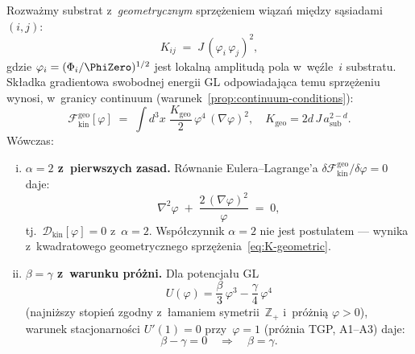 \begin{proposition}[Substrat z~geometrycznym sprz\k{e}\.zeniem;
  $\alpha = 2$ i~$\beta = \gamma$]%
\label{prop:substrate-action}
Rozwa\.zmy substrat z~\emph{geometrycznym} sprz\k{e}\.zeniem
wi\k{a}za\'n mi\k{e}dzy s\k{a}siadami $(i,j)$:
\begin{equation}\label{eq:K-geometric}
  K_{ij} \;=\; J\,(\varphi_i\,\varphi_j)^2,
\end{equation}
gdzie $\varphi_i = (\Phi_i/\PhiZero)^{1/2}$ jest lokaln\k{a}
amplitud\k{a} pola w~w\k{e}\'zle~$i$ substratu.
Sk\l{}adka gradientowa swobodnej energii GL odpowiadaj\k{a}ca
temu sprz\k{e}\.zeniu wynosi, w~granicy continuum
(warunek~\ref{prop:continuum-conditions}):
\begin{equation}\label{eq:Lkin-geo}
  \boxed{
    \mathcal{F}_{\mathrm{kin}}^{\mathrm{geo}}[\varphi]
    \;=\; \int d^3x\;\frac{K_{\mathrm{geo}}}{2}\,
          \varphi^4\,(\nabla\varphi)^2,
    \quad
    K_{\mathrm{geo}} = 2d\,J\,a_{\mathrm{sub}}^{2-d}.
  }
\end{equation}
W\'owczas:
\begin{enumerate}[(i)]
  \item \textbf{$\alpha = 2$ z~pierwszych zasad.}
    R\'ownanie Eulera--Lagrange'a
    $\delta\mathcal{F}_{\mathrm{kin}}^{\mathrm{geo}}/\delta\varphi = 0$
    daje:
    \begin{equation}\label{eq:EL-alpha2}
      \nabla^2\varphi \;+\;
        \frac{2\,(\nabla\varphi)^2}{\varphi} \;=\; 0,
    \end{equation}
    tj.\ $\mathcal{D}_{\mathrm{kin}}[\varphi] = 0$ z~$\alpha = 2$.
    Wsp\'o\l{}czynnik $\alpha = 2$ nie jest postulatem
    --- wynika z~kwadratowego geometrycznego sprz\k{e}\.zenia~\eqref{eq:K-geometric}.

  \item \textbf{$\beta = \gamma$ z~warunku pr\'o\.zni.}
    Dla potencja\l{}u GL
    \begin{equation}\label{eq:U-GL}
      U(\varphi) = \frac{\beta}{3}\,\varphi^3 - \frac{\gamma}{4}\,\varphi^4
    \end{equation}
    (najni\.zszy stopie\'n zgodny z~\l{}amaniem symetrii~$\mathbb{Z}_+$
    i~pr\'o\.zni\k{a} $\varphi > 0$),
    warunek stacjonarno\'sci $U'(1) = 0$ przy~$\varphi = 1$
    (pr\'o\.znia TGP, A1--A3) daje:
    \begin{equation}\label{eq:beta-eq-gamma}
      \beta - \gamma = 0
      \quad\Longrightarrow\quad
      \boxed{\beta = \gamma.}
    \end{equation}


\end{enumerate}
\end{proposition}
